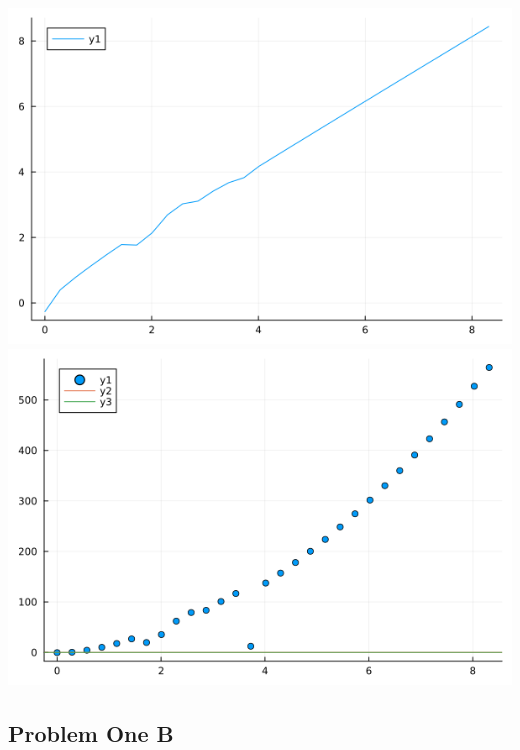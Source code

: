 \documentclass{article}
\begin{document}
\includegraphics[scale = 0.5]{consumption.png}\\
\includegraphics[scale = 0.5]{resid.png}\\

\subsection*{Problem One B}
\end{document}

